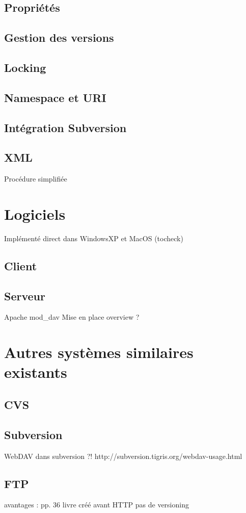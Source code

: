 \documentclass[a4paper, 11pt]{article}
\begin{document}
	\subsection{Propriétés}
	\subsection{Gestion des versions}
	\subsection{Locking}
	\subsection{Namespace et URI}
	\subsection{Intégration Subversion}
	\subsection{XML}
		Procédure simplifiée
\section{Logiciels}
	Implémenté direct dans WindowsXP et MacOS (tocheck)
	\subsection{Client}
	\subsection{Serveur}
		Apache mod\_dav
		Mise en place overview ?
\section{Autres systèmes similaires existants}
	\subsection{CVS}
	\subsection{Subversion}
		WebDAV dans subversion ?!
		http://subversion.tigris.org/webdav-usage.html
	\subsection{FTP}
		avantages : pp. 36 livre
		créé avant HTTP
		pas de versioning
\end{document}
